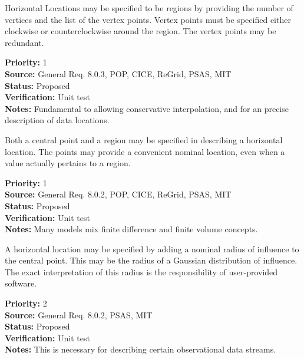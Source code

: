 
  Horizontal Locations may be specified to be regions by providing the number
of vertices and the list of the vertex points.  Vertex points must be specified
either clockwise or counterclockwise around the region.  The vertex points
may be redundant.
\begin{reqlist}
{\bf Priority:} 1 \\
{\bf Source:} General Req. 8.0.3, POP, CICE, ReGrid, 
              PSAS, MIT \\
{\bf Status:} Proposed \\
{\bf Verification:} Unit test\\
{\bf Notes:} Fundamental to allowing conservative interpolation, and for an
precise description of data locations.
\end{reqlist}
 

  Both a central point and a region may be specified in describing a horizontal
location.  The points may provide a convenient nominal location, even when
a value actually pertains to a region.
\begin{reqlist}
{\bf Priority:} 1 \\
{\bf Source:} General Req. 8.0.2, POP, CICE, ReGrid, 
              PSAS, MIT \\
{\bf Status:} Proposed \\
{\bf Verification:} Unit test\\
{\bf Notes:} Many models mix finite difference and finite volume concepts.
\end{reqlist}


  A horizontal location may be specified by adding a nominal radius of
influence to the central point.  This may be the radius of a Gaussian
distribution of influence. The exact interpretation of this radius is
the responsibility of user-provided software.
\begin{reqlist}
{\bf Priority:} 2 \\
{\bf Source:} General Req. 8.0.2, 
              PSAS, MIT \\
{\bf Status:} Proposed \\
{\bf Verification:} Unit test\\
{\bf Notes:} This is necessary for describing certain observational data streams.
\end{reqlist}


